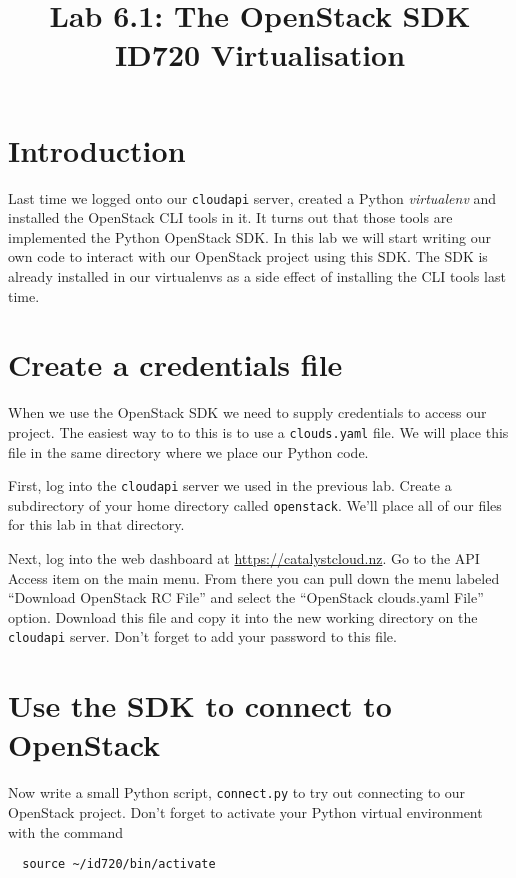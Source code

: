 \documentclass{article}
\begin{document}
\title{Lab 6.1: The OpenStack SDK \\ ID720 Virtualisation}
\date{}
\maketitle

\section*{Introduction}
Last time we logged onto our \texttt{cloudapi} server, created a Python \emph{virtualenv} and installed the OpenStack CLI tools in it. It turns out that those tools are implemented the Python OpenStack SDK. In this lab we will start writing our own code to interact with our OpenStack project using this SDK. The SDK is already installed in our virtualenvs as a side effect of installing the CLI tools last time.

\section{Create a credentials file}
When we use the OpenStack SDK we need to supply credentials to access our project. The easiest way to to this is to use a \texttt{clouds.yaml} file. We will place this file in the same directory where we place our Python code.

First, log into the \texttt{cloudapi} server we used in the previous lab. Create a subdirectory of your home directory called \texttt{openstack}. We'll place all of our files for this lab in that directory.

Next, log into the web dashboard at \url{https://catalystcloud.nz}. Go to the API Access item on the main menu. From there you can pull down the menu labeled ``Download OpenStack RC File'' and select the ``OpenStack clouds.yaml File'' option. Download this file and copy it into the new working directory on the \texttt{cloudapi} server. Don't forget to add your password to this file.

\section{Use the SDK to connect to OpenStack}
Now write a small Python script, \texttt{connect.py} to try out connecting to our OpenStack project. Don't forget to activate your Python virtual environment with the command

\begin{verbatim}
  source ~/id720/bin/activate
\end{verbatim}
\end{document}

